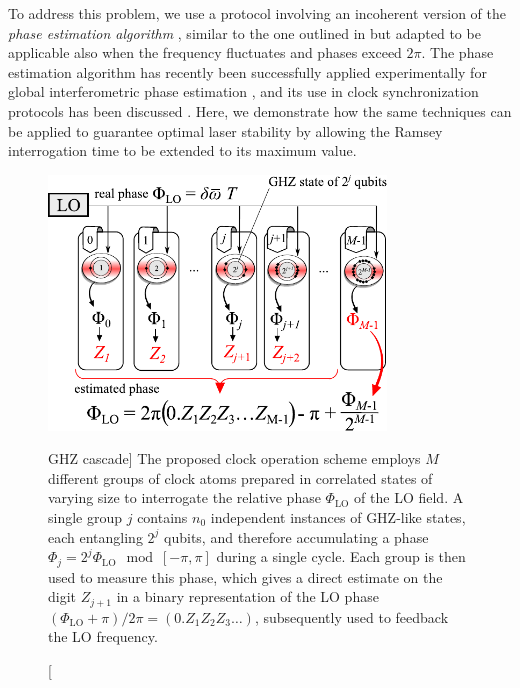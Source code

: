 To address this problem, we use a protocol involving an incoherent version of
the \textit{phase estimation algorithm} \cite{Nielsen_Chuang}, similar to the
one outlined in \cite{Giovannetti2006} but adapted to be applicable also when
the frequency fluctuates and phases exceed $2\pi$. The
phase estimation algorithm has recently been successfully applied experimentally
for global interferometric phase estimation \cite{Higgins2007,Mitchell2005}, and
its use in clock synchronization protocols has been discussed \cite{Burgh2005}.
Here, we demonstrate how the same techniques can be applied to
guarantee optimal laser stability by allowing the Ramsey interrogation
time to be extended to its maximum value.

\begin{figure}
\centering
\includegraphics[width=0.8\textwidth]{./figs_Kessler2014/fig2.pdf}
\caption
[GHZ cascade]
{
\label{fig:phase_estimation}
The proposed clock operation scheme employs $M$ different groups of clock atoms
prepared in correlated states of varying size to interrogate the relative phase
$\Phi_\mathrm{LO}$ of the LO field.
A single group $j$ contains $n_0$ independent instances of GHZ-like states, each
entangling $2^j$ qubits, and therefore accumulating a phase $\Phi_j = 2^j
\Phi_\mathrm{LO} \mod [-\pi,\pi]$ during a single cycle. Each group is then used
to measure this phase, which gives a direct estimate on the digit $Z_{j+1}$ in a
binary representation of the LO phase
$(\Phi_\mathrm{LO}+\pi)/2\pi=(0.Z_1Z_2Z_3\hdots)$,
subsequently used to feedback the LO frequency.
}
\end{figure}

